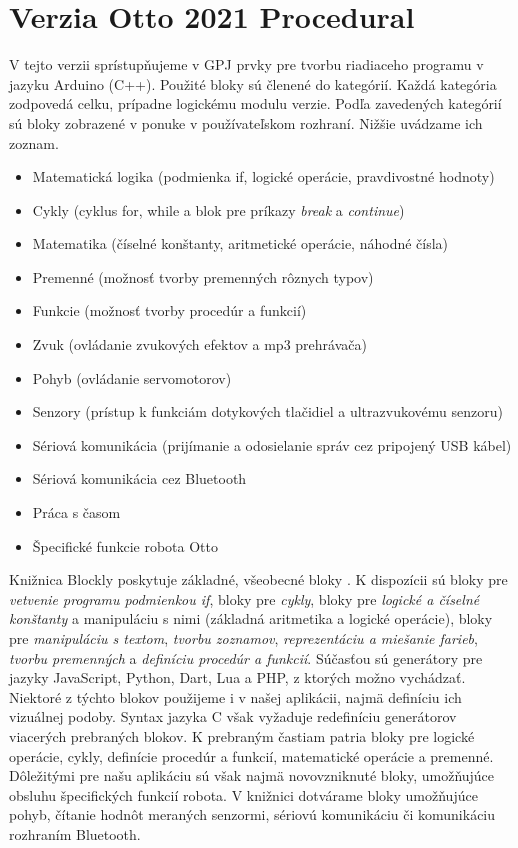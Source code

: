 \section{Verzia Otto 2021 Procedural}
V tejto verzii sprístupňujeme v GPJ prvky pre tvorbu riadiaceho programu v jazyku Arduino (C++). Použité bloky sú členené do kategórií. Každá kategória zodpovedá  celku, prípadne logickému modulu verzie. Podľa zavedených kategórií sú bloky zobrazené v ponuke v používateľskom rozhraní. Nižšie uvádzame ich zoznam.

\begin{itemize}[topsep=8pt,itemsep=0.1pt,partopsep=4pt, parsep=4pt]
\item Matematická logika (podmienka if, logické operácie, pravdivostné hodnoty)
\item Cykly (cyklus for, while a blok pre príkazy \textit{break} a \textit{continue})
\item Matematika (číselné konštanty, aritmetické operácie, náhodné čísla)
\item Premenné (možnosť tvorby premenných rôznych typov)
\item Funkcie (možnosť tvorby procedúr a funkcií)
\item Zvuk (ovládanie zvukových efektov a mp3 prehrávača)
\item Pohyb (ovládanie servomotorov)
\item Senzory (prístup k funkciám dotykových tlačidiel a ultrazvukovému senzoru)
\item Sériová komunikácia (prijímanie a odosielanie správ cez pripojený USB kábel)
\item Sériová komunikácia cez Bluetooth
\item Práca s časom
\item Špecifické funkcie robota Otto
\end{itemize}

Knižnica Blockly poskytuje základné, všeobecné bloky . K dispozícii sú bloky pre \textit{vetvenie programu podmienkou if}, bloky pre \textit{cykly}, bloky pre \textit{logické a číselné konštanty} a manipuláciu s nimi (základná aritmetika a logické operácie), bloky pre \textit{manipuláciu s textom}, \textit{tvorbu zoznamov}, \textit{reprezentáciu a miešanie farieb}, \textit{tvorbu premenných} a \textit{definíciu procedúr a funkcií}. Súčasťou sú generátory pre jazyky JavaScript, Python, Dart, Lua a PHP, z ktorých možno vychádzať. Niektoré z týchto blokov použijeme i v našej aplikácii, najmä definíciu ich vizuálnej podoby. Syntax jazyka C však vyžaduje redefiníciu generátorov viacerých prebraných blokov. K prebraným častiam patria bloky pre logické operácie, cykly, definície procedúr a funkcií, matematické operácie a premenné. Dôležitými pre našu aplikáciu sú však najmä novovzniknuté bloky, umožňujúce obsluhu špecifických funkcií robota. V knižnici dotvárame bloky umožňujúce pohyb, čítanie hodnôt meraných senzormi, sériovú komunikáciu či komunikáciu rozhraním Bluetooth. 

